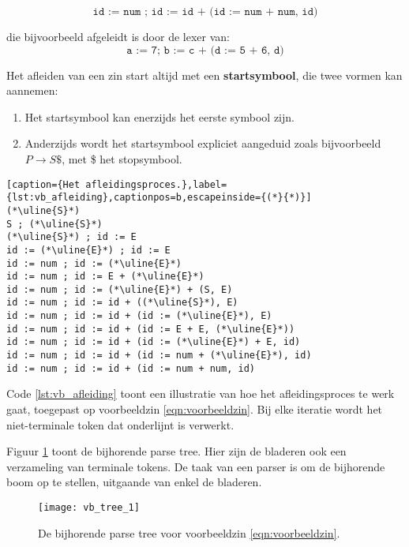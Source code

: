 \begin{equation}\label{eqn:voorbeeldzin}
\texttt{id := num ; id := id + (id := num + num, id)}
\end{equation}


die bijvoorbeeld afgeleidt is door de lexer van:
$$\texttt{a := 7; b := c + (d := 5 + 6, d)}$$

Het afleiden van een zin start altijd met een \textbf{startsymbool}, die twee vormen kan aannemen:
\begin{enumerate}
	\item Het startsymbool kan enerzijds het eerste symbool zijn.
	\item Anderzijds wordt het startsymbool expliciet aangeduid zoals bijvoorbeeld $P \rightarrow S\$$, met \$ het stopsymbool.
\end{enumerate}

\begin{lstlisting}[caption={Het afleidingsproces.},label={lst:vb_afleiding},captionpos=b,escapeinside={(*}{*)}]
(*\uline{S}*)
S ; (*\uline{S}*)
(*\uline{S}*) ; id := E
id := (*\uline{E}*) ; id := E
id := num ; id := (*\uline{E}*)
id := num ; id := E + (*\uline{E}*)
id := num ; id := (*\uline{E}*) + (S, E)
id := num ; id := id + ((*\uline{S}*), E)
id := num ; id := id + (id := (*\uline{E}*), E)
id := num ; id := id + (id := E + E, (*\uline{E}*))
id := num ; id := id + (id := (*\uline{E}*) + E, id)
id := num ; id := id + (id := num + (*\uline{E}*), id)
id := num ; id := id + (id := num + num, id)
\end{lstlisting}

Code \ref{lst:vb_afleiding} toont een illustratie van hoe het afleidingsproces te werk gaat, toegepast op voorbeeldzin \ref{eqn:voorbeeldzin}. Bij elke iteratie wordt het niet-terminale token dat onderlijnt is verwerkt.


Figuur \ref{fig:vb_tree_1} toont de bijhorende parse tree. Hier zijn de bladeren ook een verzameling van terminale tokens. De taak van een parser is om de bijhorende boom op te stellen, uitgaande van enkel de bladeren.

\begin{figure}
	\texttt{[image: vb\_tree\_1]}
	\caption{De bijhorende parse tree voor voorbeeldzin \ref{eqn:voorbeeldzin}.}
	\label{fig:vb_tree_1}
\end{figure}



